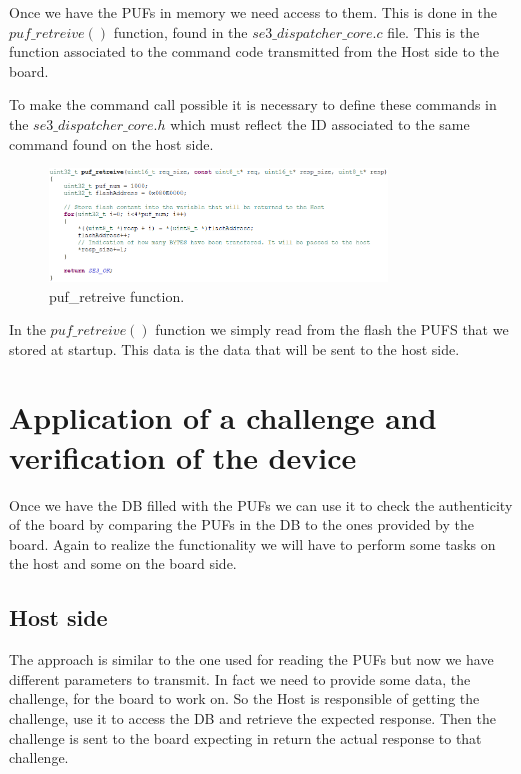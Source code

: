 Once we have the PUFs in memory we need access to them. This is done in the $puf\_retreive()$ function, found in the $se3\_dispatcher\_core.c$ file. This is the function associated to the command code transmitted from the Host side to the board.

To make the command call possible it is necessary to define these commands in the $se3\_dispatcher\_core.h$ which must reflect the ID associated to the same command found on the host side.

\begin{figure}[h!]
	\vspace{0.5cm}
	\includegraphics[width = 0.8\textwidth]{images/puf_retreive.png}
	\caption{puf\_retreive function. }
	\label{fig:puf_retreive}
\end{figure}

In the $puf\_retreive()$ function we simply read from the flash the PUFS that we stored at startup. This data is the data that will be sent to the host side.


\section {Application of a challenge and verification of the device} 
\label{section:impl_host}

Once we have the DB filled with the PUFs we can use it to check the authenticity of the board by comparing the PUFs in the DB to the ones provided by the board. Again to realize the functionality we will have to perform some tasks on the host and some on the board side.

\subsection{Host side}

The approach is similar to the one used for reading the PUFs but now we have different parameters to transmit. In fact we need to provide some data, the challenge, for the board to work on. So the Host is responsible of getting the challenge, use it to access the DB and retrieve the expected response. Then the challenge is sent to the board expecting in return the actual response to that challenge.

